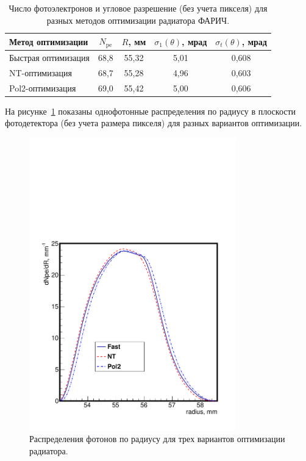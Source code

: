\documentclass[12pt]{article}
\begin{document}
\begin{table}[htbp]
\caption{Число фотоэлектронов и угловое разрешение (без учета пикселя) для разных методов оптимизации радиатора ФАРИЧ.}
\label{tab:methcomp}
\begin{center}
\begin{tabular}{lcccc}\hline
Метод оптимизации   & $N_\mathrm{pe}$ & $R$, мм & $\sigma_1(\theta)$, мрад & $\sigma_t(\theta)$, мрад \\\hline
Быстрая оптимизация & 68,8 & 55,32 & 5,01 & 0,608 \\\hline
NT-оптимизация      & 68,7 & 55,28 & 4,96 & 0,603 \\\hline
Pol2-оптимизация    & 69,0 & 55,42 & 5,00 & 0,606 \\\hline
\end{tabular}
\end{center}
\end{table}

На рисунке~\ref{fig:methcomp} показаны однофотонные распределения по радиусу в плоскости фотодетектора (без учета размера пикселя) 
для разных вариантов оптимизации. 
\begin{figure}[htbp]
\begin{center}
\includegraphics[width=0.8\textwidth]{hrad_mla4_varopt.pdf}
\caption{Распределения фотонов по радиусу для трех вариантов оптимизации радиатора.}
\label{fig:methcomp}
\end{center}
\end{figure}
\end{document}
